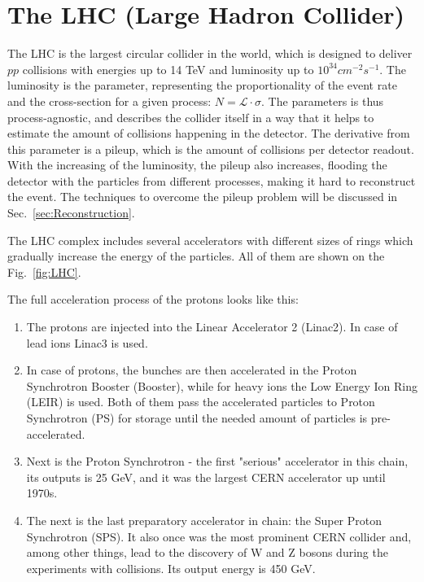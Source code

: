 \chapter{The LHC (Large Hadron Collider)}
\label{sec:LHC}

The LHC is the largest circular collider in the world, which is designed to deliver $pp$ collisions with energies up to 14 TeV and luminosity up to $10^{34} cm^{-2}s^{-1}$. The luminosity is the parameter, representing the proportionality of the event rate and the cross-section for a given process: $N = \mathcal{L} \cdot \sigma$. The parameters is thus process-agnostic, and describes the collider itself in a way that it helps to estimate the amount of collisions happening in the detector. The derivative from this parameter is a pileup, which is the amount of collisions per detector readout. With the increasing of the luminosity, the pileup also increases, flooding the detector with the particles from different processes, making it hard to reconstruct the event. The techniques to overcome the pileup problem will be discussed in Sec.~\ref{sec:Reconstruction}.

The LHC complex includes several accelerators with different sizes of rings which gradually increase the energy of the particles. All of them are shown on the Fig.~\ref{fig:LHC}.

\begin{figure}
\end{figure}

The full acceleration process of the protons looks like this:

\begin{enumerate}
\item The protons are injected into the Linear Accelerator 2 (Linac2). In case of lead ions Linac3 is used.
\item In case of protons, the bunches are then accelerated in the Proton Synchrotron Booster (Booster), while for heavy ions the Low Energy Ion Ring (LEIR) is used. Both of them pass the accelerated particles to Proton Synchrotron (PS) for storage until the needed amount of particles is pre-accelerated.
\item Next is the Proton Synchrotron - the first "serious" accelerator in this chain, its outputs is 25 GeV, and it was the largest CERN accelerator up until 1970s.
\item The next is the last preparatory accelerator in chain: the Super Proton Synchrotron (SPS). It also once was the most prominent CERN collider and, among other things, lead to the discovery of W and Z bosons during the experiments with  collisions. Its output energy is 450 GeV.
\end{enumerate}

